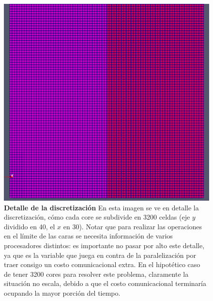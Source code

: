 \documentclass{article}
\begin{document}
\begin{figure} 
    \centering
    \includegraphics[scale=0.5]{../res/imgs/image3.png}
    \caption{\textbf{Detalle de la discretización} En esta imagen se ve en detalle la discretización, cómo cada core se subdivide en 3200 celdas (eje $y$ dividido en 40, el $x$ en 30). Notar que para realizar las operaciones en el límite de las caras se necesita información de varios procesadores distintos: es importante no pasar por alto este detalle, ya que es la variable que juega en contra de la paralelización por traer consigo un costo comunicacional extra. En el hipotético caso de tener 3200 cores para resolver este problema, claramente la situación no escala, debido a que el costo comunicacional terminaría ocupando la mayor porción del tiempo.}
\end{figure}
\end{document}
